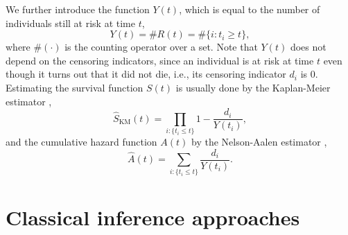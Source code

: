 We further introduce the function $Y(t)$, which is equal to the number of individuals still at risk at time $t$,
\begin{equation*}
    Y(t)=\#R(t)=\#\{i\colon t_i\geq t\},
\end{equation*}
where $\#(\cdot)$ is the counting operator over a set.
Note that $Y(t)$ does not depend on the censoring indicators, since an individual is at risk at time $t$ even though it turns out that it did not die, i.e., its censoring indicator $d_i$ is 0.
Estimating the survival function $S(t)$ is usually done by the Kaplan-Meier estimator \citep{kaplan-meier},
\begin{equation*}
    \hat{S}_{\text{KM}}(t)=\prod_{i:\{t_i\leq t\}}1-\frac{d_i}{Y(t_i)},
\end{equation*}
and the cumulative hazard function $A(t)$ by the Nelson-Aalen estimator \citep{nelson, aalen1978},
\begin{equation*}
    \hat{A}(t)=\sum_{i:\{t_i\leq t\}}\frac{d_i}{Y(t_i)}.
\end{equation*}

\section{Classical inference approaches}
